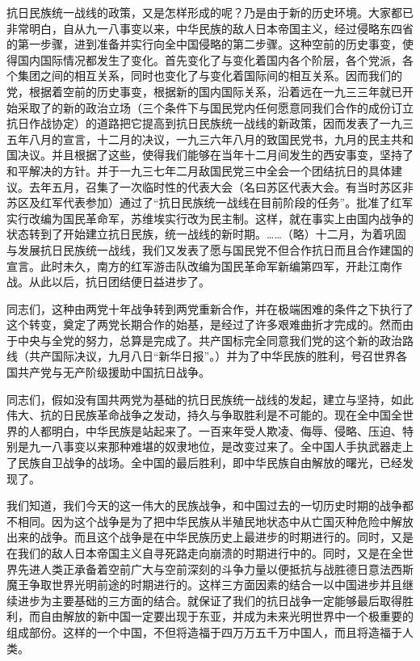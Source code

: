 抗日民族统一战线的政策，又是怎样形成的呢？乃是由于新的历史环境。大家都已非常明白，自从九一八事变以来，中华民族的敌人日本帝国主义，经过侵略东四省的第一步骤，进到准备并实行向全中国侵略的第二步骤。这种空前的历史事变，使得国内国际情况都发生了变化。首先变化了与变化着国内各个阶层，各个党派，各个集团之间的相互关系，同时也变化了与变化着国际间的相互关系。因而我们的党，根据着空前的历史事变，根据新的国内国际关系，沿着远在一九三三年就已开始采取了的新的政治立场（三个条件下与国民党内任何愿意同我们合作的成份订立抗日作战协定）的道路把它提高到抗日民族统一战线的新政策，因而发表了一九三五年八月的宣言，十二月的决议，一九三六年八月的致国民党书，九月的民主共和国决议。并且根据了这些，使得我们能够在当年十二月间发生的西安事变，坚持了和平解决的方针。并于一九三七年二月敌国民党三中全会一个团结抗日的具体建议。去年五月，召集了一次临时性的代表大会（名曰苏区代表大会。有当时苏区非苏区及红军代表参加）通过了“抗日民族统一战线在目前阶段的任务”。批准了红军实行改编为国民革命军，苏维埃实行改为民主制。这样，就在事实上由国内战争的状态转到了开始建立抗日民族，统一战线的新时期。……（略）十二月，为着巩固与发展抗日民族统一战线，我们又发表了愿与国民党不但合作抗日而且合作建国的宣言。此时未久，南方的红军游击队改编为国民革命军新编第四军，开赴江南作战。从此以后，抗日团结便日益进步了。

同志们，这种由两党十年战争转到两党重新合作，并在极端困难的条件之下执行了这个转变，奠定了两党长期合作的始基，是经过了许多艰难曲折才完成的。然而由于中央与全党的努力，总算是完成了。共产国标完全同意我们党的这个新的政治路线（共产国际决议，九月八日“新华日报”。）并为了中华民族的胜利，号召世界各国共产党与无产阶级援助中国抗日战争。

同志们，假如没有国共两党为基础的抗日民族统一战线的发起，建立与坚持，如此伟大、抗的日民族革命战争之发动，持久与争取胜利是不可能的。现在全中国全世界的人都明白，中华民族是站起来了。一百来年受人欺凌、侮辱、侵略、压迫、特别是九一八事变以来那种难堪的奴隶地位，是改变过来了。全中国人手执武器走上了民族自卫战争的战场。全中国的最后胜利，即中华民族自由解放的曙光，已经发现了。

我们知道，我们今天的这一伟大的民族战争，和中国过去的一切历史时期的战争都不相同。因为这个战争是为了把中华民族从半殖民地状态中从亡国灭种危险中解放出来的战争。而且这个战争是在中华民族历史上最进步的时期进行的。同时，又是在我们的敌人日本帝国主义自寻死路走向崩溃的时期进行中的。同时，又是在全世界先进人类正承备着空前广大与空前深刻的斗争力量以便抵抗与战胜德日意法西斯魔王争取世界光明前途的时期进行的。这样三方面因素的结合一以中国进步并且继续进步为主要基础的三方面的结合。就保证了我们的抗日战争一定能够最后取得胜利，而自由解放的新中国一定要出现于东亚，并成为未来光明世界中一个极重要的组成部份。这样的一个中国，不但将造福于四万万五千万中国人，而且将造福于人类。

